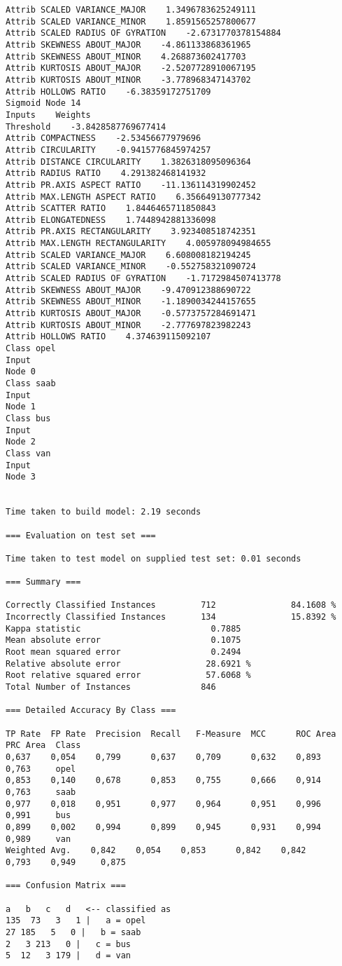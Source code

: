 \documentclass[
	article,			%
	11pt,				%
	oneside,			%
	a4paper,			%
	english,			%
	brazil,				%
	sumario=tradicional
	]{abntex2}
\begin{document}
\begin{lstlisting}
Attrib SCALED VARIANCE_MAJOR    1.3496783625249111
Attrib SCALED VARIANCE_MINOR    1.8591565257800677
Attrib SCALED RADIUS OF GYRATION    -2.6731770378154884
Attrib SKEWNESS ABOUT_MAJOR    -4.861133868361965
Attrib SKEWNESS ABOUT_MINOR    4.268873602417703
Attrib KURTOSIS ABOUT_MAJOR    -2.5207728910067195
Attrib KURTOSIS ABOUT_MINOR    -3.778968347143702
Attrib HOLLOWS RATIO    -6.38359172751709
Sigmoid Node 14
Inputs    Weights
Threshold    -3.8428587769677414
Attrib COMPACTNESS    -2.53456677979696
Attrib CIRCULARITY    -0.9415776845974257
Attrib DISTANCE CIRCULARITY    1.3826318095096364
Attrib RADIUS RATIO    4.291382468141932
Attrib PR.AXIS ASPECT RATIO    -11.136114319902452
Attrib MAX.LENGTH ASPECT RATIO    6.356649130777342
Attrib SCATTER RATIO    1.8446465711850843
Attrib ELONGATEDNESS    1.7448942881336098
Attrib PR.AXIS RECTANGULARITY    3.923408518742351
Attrib MAX.LENGTH RECTANGULARITY    4.005978094984655
Attrib SCALED VARIANCE_MAJOR    6.608008182194245
Attrib SCALED VARIANCE_MINOR    -0.552758321090724
Attrib SCALED RADIUS OF GYRATION    -1.7172984507413778
Attrib SKEWNESS ABOUT_MAJOR    -9.470912388690722
Attrib SKEWNESS ABOUT_MINOR    -1.1890034244157655
Attrib KURTOSIS ABOUT_MAJOR    -0.5773757284691471
Attrib KURTOSIS ABOUT_MINOR    -2.777697823982243
Attrib HOLLOWS RATIO    4.374639115092107
Class opel
Input
Node 0
Class saab
Input
Node 1
Class bus
Input
Node 2
Class van
Input
Node 3


Time taken to build model: 2.19 seconds

=== Evaluation on test set ===

Time taken to test model on supplied test set: 0.01 seconds

=== Summary ===

Correctly Classified Instances         712               84.1608 %
Incorrectly Classified Instances       134               15.8392 %
Kappa statistic                          0.7885
Mean absolute error                      0.1075
Root mean squared error                  0.2494
Relative absolute error                 28.6921 %
Root relative squared error             57.6068 %
Total Number of Instances              846     

=== Detailed Accuracy By Class ===

TP Rate  FP Rate  Precision  Recall   F-Measure  MCC      ROC Area  PRC Area  Class
0,637    0,054    0,799      0,637    0,709      0,632    0,893     0,763     opel
0,853    0,140    0,678      0,853    0,755      0,666    0,914     0,763     saab
0,977    0,018    0,951      0,977    0,964      0,951    0,996     0,991     bus
0,899    0,002    0,994      0,899    0,945      0,931    0,994     0,989     van
Weighted Avg.    0,842    0,054    0,853      0,842    0,842      0,793    0,949     0,875     

=== Confusion Matrix ===

a   b   c   d   <-- classified as
135  73   3   1 |   a = opel
27 185   5   0 |   b = saab
2   3 213   0 |   c = bus
5  12   3 179 |   d = van


\end{lstlisting}
\end{document}
